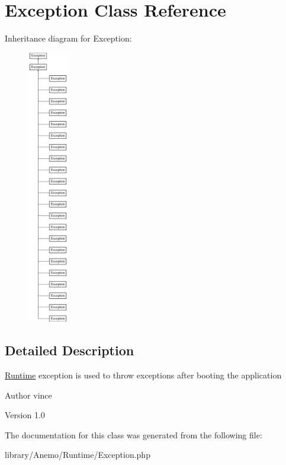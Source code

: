 \hypertarget{class_anemo_1_1_runtime_1_1_exception}{
\section{Exception Class Reference}
\label{class_anemo_1_1_runtime_1_1_exception}
}
Inheritance diagram for Exception:\begin{figure}[H]
\begin{center}
\leavevmode
\includegraphics[height=12.000000cm]{class_anemo_1_1_runtime_1_1_exception}
\end{center}
\end{figure}


\subsection{Detailed Description}
\hyperlink{namespace_anemo_1_1_runtime}{Runtime} exception is used to throw exceptions after booting the application \begin{DoxyAuthor}{Author}
vince 
\end{DoxyAuthor}
\begin{DoxyVersion}{Version}
1.0 
\end{DoxyVersion}


The documentation for this class was generated from the following file:\begin{DoxyCompactItemize}
\item 
library/Anemo/Runtime/Exception.php\end{DoxyCompactItemize}
